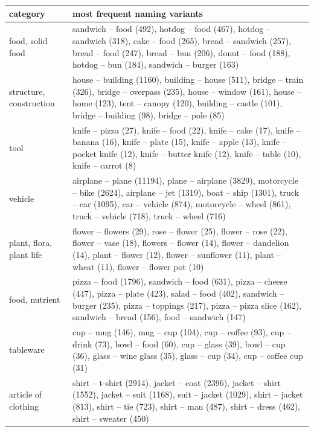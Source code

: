\documentclass[11pt,a4paper]{article}
\begin{document}
\begin{table}
\small
\begin{tabular}{lp{12cm}}
\toprule
                         category &                                                                                                                                                                                                                    most frequent naming variants \\
\midrule
 food, solid food &  sandwich -- food (492), hotdog -- food (467), hotdog -- sandwich (318), cake -- food (265), bread -- sandwich (257), bread -- food (247), bread -- bun (206), donut -- food (188), hotdog -- bun (184), sandwich -- burger (163) \\
 structure, construction &  house -- building (1160), building -- house (511), bridge -- train (326), bridge -- overpass (235), house -- window (161), house -- home (123), tent -- canopy (120), building -- castle (101), bridge -- building (98), bridge -- pole (85) \\
 tool &  knife -- pizza (27), knife -- food (22), knife -- cake (17), knife -- banana (16), knife -- plate (15), knife -- apple (13), knife -- pocket knife (12), knife -- butter knife (12), knife -- table (10), knife -- carrot (8) \\
 vehicle &  airplane -- plane (11194), plane -- airplane (3829), motorcycle -- bike (2624), airplane -- jet (1319), boat -- ship (1301), truck -- car (1095), car -- vehicle (874), motorcycle -- wheel (861), truck -- vehicle (718), truck -- wheel (716) \\
 plant, flora, plant life &  flower -- flowers (29), rose -- flower (25), flower -- rose (22), flower -- vase (18), flowers -- flower (14), flower -- dandelion (14), plant -- flower (12), flower -- sunflower (11), plant -- wheat (11), flower -- flower pot (10) \\
 food, nutrient &  pizza -- food (1796), sandwich -- food (631), pizza -- cheese (447), pizza -- plate (423), salad -- food (402), sandwich -- burger (235), pizza -- toppings (217), pizza -- pizza slice (162), sandwich -- bread (156), food -- sandwich (147) \\
 tableware &  cup -- mug (146), mug -- cup (104), cup -- coffee (93), cup -- drink (73), bowl -- food (60), cup -- glass (39), bowl -- cup (36), glass -- wine glass (35), glass -- cup (34), cup -- coffee cup (31) \\
 article of clothing &  shirt -- t-shirt (2914), jacket -- coat (2396), jacket -- shirt (1552), jacket -- suit (1168), suit -- jacket (1029), shirt -- jacket (813), shirt -- tie (723), shirt -- man (487), shirt -- dress (462), shirt -- sweater (450) \\

\end{tabular}
\end{table}
\end{document}
